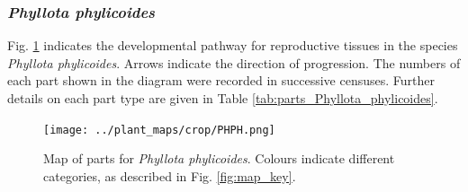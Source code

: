 \documentclass[10pt,twoside]{article}\usepackage[]{graphicx}\usepackage[]{color}
\begin{document}
\clearpage

\subsubsection{\emph{Phyllota phylicoides}}

Fig. \ref{fig:map_Phyllota_phylicoides} indicates the developmental pathway for reproductive tissues in the species \emph{Phyllota phylicoides}. Arrows indicate the direction of progression.  The numbers of each part shown in the diagram were recorded in successive censuses. Further details on each part type are given in Table \ref{tab:parts_Phyllota_phylicoides}.

\begin{figure}[h]
\centering
\texttt{[image: ../plant\_maps/crop/PHPH.png]}
\caption{Map of parts for \emph{Phyllota phylicoides}. Colours indicate different categories, as described in Fig. \ref{fig:map_key}.}
\label{fig:map_Phyllota_phylicoides}
\end{figure}

\clearpage
\end{document}
